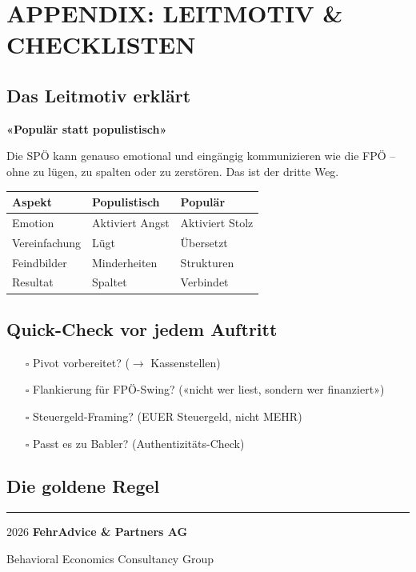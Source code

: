 \documentclass[11pt,a4paper]{article}
\begin{document}
\section*{APPENDIX: LEITMOTIV \& CHECKLISTEN}

\subsection*{Das Leitmotiv erklärt}

\textbf{«Populär statt populistisch»}

Die SPÖ kann genauso emotional und eingängig kommunizieren wie die FPÖ -- ohne zu lügen, zu spalten oder zu zerstören. Das ist der dritte Weg.

\begin{tabular}{@{}L{2.5cm} L{4cm} L{4cm}@{}}
\textbf{Aspekt} & \textbf{Populistisch} & \textbf{Populär} \\
\midrule
Emotion & Aktiviert Angst & Aktiviert Stolz \\
Vereinfachung & Lügt & Übersetzt \\
Feindbilder & Minderheiten & Strukturen \\
Resultat & Spaltet & Verbindet \\
\end{tabular}

\subsection*{Quick-Check vor jedem Auftritt}

\begin{itemize}
    \item[$\square$] Pivot vorbereitet? ($\rightarrow$ Kassenstellen)
    \item[$\square$] Flankierung für FPÖ-Swing? («nicht wer liest, sondern wer finanziert»)
    \item[$\square$] Steuergeld-Framing? (EUER Steuergeld, nicht MEHR)
    \item[$\square$] Passt es zu Babler? (Authentizitäts-Check)
\end{itemize}

\subsection*{Die goldene Regel}

\begin{center}
\end{center}

\vfill

\begin{center}
{\color{fadarkblue}\rule{0.5\textwidth}{1pt}}

\vspace{0.5cm}

\textcopyright{} 2026 \textbf{\color{fadarkblue}FehrAdvice \& Partners AG}

\vspace{0.3cm}

{\small Behavioral Economics Consultancy Group}
\end{center}
\end{document}
